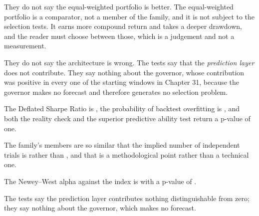They do not say the equal-weighted portfolio is better. The equal-weighted
portfolio is a comparator, not a member of the family, and it is not
subject to the selection tests. It earns more compound return and takes a
deeper drawdown, and the reader must choose between those, which is a
judgement and not a measurement.

They do not say the architecture is wrong. The tests say that the
\emph{prediction layer} does not contribute. They say nothing about the
governor, whose contribution was positive in every one of the
\numWindowCount{} starting windows in Chapter 31, because the governor
makes no forecast and therefore generates no selection problem.

\begin{keytakeaways}
\item The Deflated Sharpe Ratio is \numDSR{}, the probability of backtest
overfitting is \numPBO{}, and both the reality check and the superior
predictive ability test return a p-value of one.
\item The family's members are so similar that the implied number of
independent trials is \numImpliedTrials{} rather than \numFamilySize{},
and that is a methodological point rather than a technical one.
\item The Newey--West alpha against the index is \numAlphaT{} with a
p-value of \numAlphaP{}.
\item The tests say the prediction layer contributes nothing
distinguishable from zero; they say nothing about the governor, which
makes no forecast.
\end{keytakeaways}
